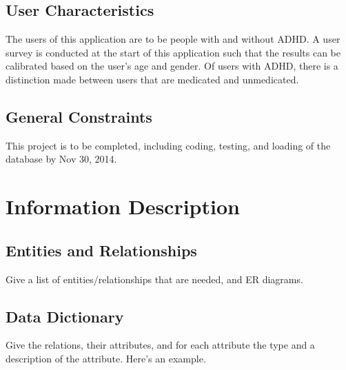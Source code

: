 \documentclass[a4wide]{article}
\begin{document}
\subsection{User Characteristics}

The users of this application are to be people with and without ADHD. A user
survey is conducted at the start of this application such that the results can
be calibrated based on the user's age and gender. Of users with ADHD, there is a
distinction made between users that are medicated and unmedicated.

\subsection{General Constraints}

This project is to be completed, including coding, testing, and loading of the
database by Nov 30, 2014.


\section{Information Description}

\subsection{Entities and Relationships}

Give a list of entities/relationships that are needed,
and ER diagrams.

\subsection{Data Dictionary}

Give the relations, their attributes, and for each attribute the
type and a description of the attribute.  Here's an example.

\end{document}
